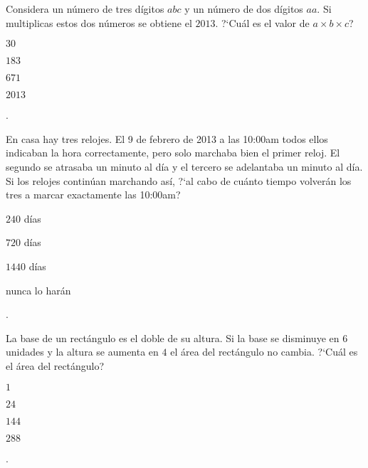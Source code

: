 \begin{Problema}{8}
  Considera un n\'umero de tres d\'igitos $abc$ y un n\'umero de
  dos d\'igitos $aa$. Si multiplicas estos dos n\'umeros se obtiene el $2013$. ?`Cu\'al
  es el valor de $a \times b \times c$?

\begin{inparaenum}
\item $30$ \espm
\item $183$ \espm
\item $671$ \espm
\item $2013$ \espm
\item \nota.
\end{inparaenum}
\end{Problema}

\begin{Problema}{9}
  En casa hay tres relojes. El 9 de febrero de 2013 a las 10:00am
  todos ellos indicaban la hora correctamente, pero solo marchaba bien
  el primer reloj. El segundo se atrasaba un minuto al d\'ia y el
  tercero se adelantaba un minuto al d\'ia. Si los relojes contin\'uan
  marchando as\'i, ?`al cabo de cu\'anto tiempo volver\'an los tres a
  marcar exactamente las 10:00am?

\begin{inparaenum}
\item $240$ d\'ias \espsc
\item $720$ d\'ias \espsc
\item $1440$ d\'ias \espsc
\item nunca lo har\'an \espsc
\item \nota.
\end{inparaenum}
\end{Problema}


\begin{Problema}{10}
La base de un rect\'angulo es el doble de su altura. Si la base
  se disminuye en $6$ unidades y la altura se aumenta en $4$ el \'area
  del rect\'angulo no cambia. ?`Cu\'al es el \'area del rect\'angulo?

\begin{inparaenum}
\item $1$ \espm
\item $24$ \espm
\item $144$ \espm
\item $288$ \espm
\item \nota.
\end{inparaenum}
\end{Problema}

